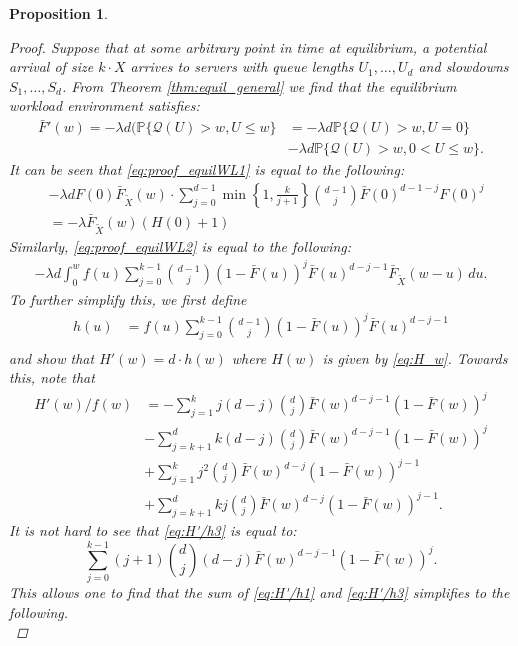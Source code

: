 \documentclass[12pt]{report}
\newcommand{\QQ}{\mathcal{Q}}
\newtheorem{proposition}[theorem]{Proposition}
\begin{document}
\begin{proposition}
\begin{proof}
Suppose that at some arbitrary point in time at equilibrium, a potential arrival of size $k \cdot X$ arrives to servers with queue lengths $U_1,\dots,U_d$ and slowdowns $S_1,\dots,S_d$. From Theorem \ref{thm:equil_general} we find that the equilibrium workload environment satisfies:
\begin{align}
\bar F'(w)= -\lambda d (\mathbb{P}\{\QQ(U)>w, U \leq w\} &= -\lambda d \mathbb{P}\{\QQ(U)>w, U = 0\} \label{eq:proof_equilWL1}\\
&-\lambda d \mathbb{P}\{\QQ(U)>w, 0<U\leq w\} \label{eq:proof_equilWL2}.
\end{align}
It can be seen that \eqref{eq:proof_equilWL1} is equal to the following:
\begin{align}
&-\lambda d F(0) \bar F_{\tilde X}(w) \cdot \sum_{j=0}^{d-1} \min\left\{ 1 , \frac{k}{j+1} \right\} \binom{d-1}{j} \bar F(0)^{d-1-j} F(0)^j \nonumber\\
&=-\lambda \bar F_{\tilde{X}}(w) (H(0)+1) \label{eq:proof_equilWL3}
\end{align}
Similarly, \eqref{eq:proof_equilWL2} is equal to the following:
\begin{align}
-\lambda d \int_0^w f(u) \sum_{j=0}^{k-1} \binom{d-1}{j} (1-\bar F(u))^j \bar F(u)^{d-j-1} \bar F_{\tilde{X}}(w-u)\, du. \label{eq:proof_equilWL4}
\end{align}
To further simplify this, we first define
\begin{align*}
h(u)&= f(u) \sum_{j=0}^{k-1} \binom{d-1}{j} (1-\bar F(u))^j \bar F(u)^{d-j-1}\\
\end{align*}
and show that $H'(w) = d\cdot h(w)$ where $H(w)$ is given by \eqref{eq:H_w}. Towards this, note that
\begin{align}
H'(w)/f(w)
&= -\sum_{j=1}^k j (d-j) \binom{d}{j} \bar F(w)^{d-j-1} (1-\bar F(w))^j \label{eq:H'/h1}\\
&-\sum_{j=k+1}^d k(d-j) \binom{d}{j} \bar F(w)^{d-j-1} (1-\bar F(w))^j \label{eq:H'/h2}\\
&+\sum_{j=1}^k j^2 \binom{d}{j} \bar F(w)^{d-j} (1-\bar F(w))^{j-1} \label{eq:H'/h3}\\
&+\sum_{j=k+1}^d k j \binom{d}{j} \bar F(w)^{d-j} (1-\bar F(w))^{j-1} \label{eq:H'/h4}.
\end{align}
It is not hard to see that \eqref{eq:H'/h3} is equal to:
$$
\sum_{j=0}^{k-1} (j+1) \binom{d}{j} (d-j) \bar F(w)^{d-j-1} (1-\bar F(w))^j.
$$
This allows one to find that the sum of \eqref{eq:H'/h1} and \eqref{eq:H'/h3} simplifies to the following.
\begin{equation}

\end{equation}
\end{proof}
\end{proposition}
\end{document}
